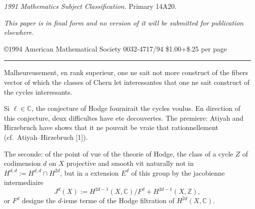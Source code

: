 \documentclass[11pt,a4paper]{article}
\theoremstyle{plain}
\theoremstyle{definition}
\newcommand{\Z}{\mathbb{Z}}
\newcommand{\C}{\mathbb{C}}
\begin{document}
\textit{1991 Mathematics Subject Classification.} Primary 14A20.

\textit{This paper is in final form and no version of it will be submitted for publication elsewhere.}

\noindent\copyright 1994 American Mathematical Society
\hfill 0032-4717/94 \$1.00+\$.25 per page

\vspace{0.5em}
\noindent\rule{\textwidth}{0.4pt}

Malheureusement, en rank superieur, one ne sait not more construct of the fibers vector of which the classes of Chern let interessantes that one ne sait construct of the cycles interessants.

Si $\ell \in \C$, the conjecture of Hodge fournirait the cycles voulus. En direction of this conjecture, deux difficultes have ete decouvertes. The premiere: Atiyah and Hirzebruch have shows that it ne pouvait be vraie that rationnellement (cf.~Atiyah--Hirzebruch [1]).

The seconde: of the point of vue of the theorie of Hodge, the class of a cycle $Z$ of codimension $d$ on $X$ projective and smooth vit naturally not in $H^{d,d} := H^{d,d} \cap H^{2d}$, but in a extension $E^d$ of this group by the jacobienne intermediaire
$$
J^d(X) := H^{2d-1}(X, \C) / F^d + H^{2d-1}(X, \Z),
$$
or $F^d$ designe the $d$-ieme terme of the Hodge filtration of $H^{2d}(X, \C)$.
\end{document}

